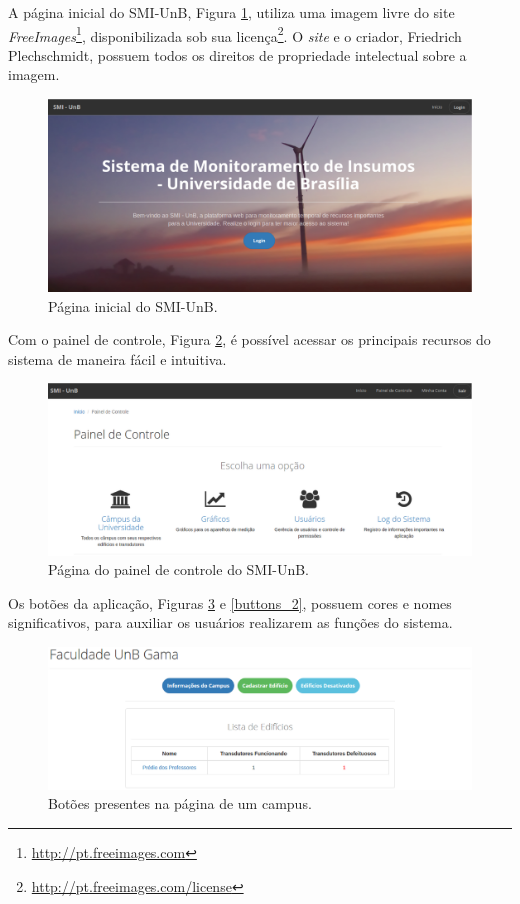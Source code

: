 A página inicial do SMI-UnB, Figura \ref{main_page}, utiliza uma imagem livre do site \textit{FreeImages}\footnote{\url{http://pt.freeimages.com}}, disponibilizada sob sua licença\footnote{\url{http://pt.freeimages.com/license}}. O \textit{site} e o criador, Friedrich Plechschmidt, possuem todos os direitos de propriedade intelectual sobre a imagem.

\begin{figure}[!h]
    \centering
    \includegraphics[scale=0.35]{figuras/main_page.eps}
    \caption{Página inicial do SMI-UnB.}
    \label{main_page}
\end{figure}

Com o painel de controle, Figura \ref{dashboard}, é possível acessar os principais recursos do sistema de maneira fácil e intuitiva.

\begin{figure}[!h]
    \centering
    \includegraphics[scale=0.35]{figuras/dashboard.eps}
    \caption{Página do painel de controle do SMI-UnB.}
    \label{dashboard}
\end{figure}

Os botões da aplicação, Figuras \ref{buttons} e \ref{buttons_2}, possuem cores e nomes significativos, para auxiliar os usuários realizarem as funções do sistema.

\begin{figure}[!h]
    \centering
    \includegraphics[scale=0.4]{figuras/buttons.eps}
    \caption{Botões presentes na página de um campus.}
    \label{buttons}
\end{figure}

